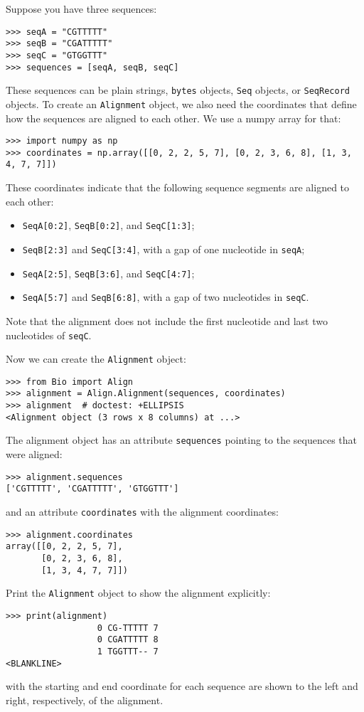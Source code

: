 Suppose you have three sequences:
\begin{verbatim}
>>> seqA = "CGTTTTT"
>>> seqB = "CGATTTTT"
>>> seqC = "GTGGTTT"
>>> sequences = [seqA, seqB, seqC]
\end{verbatim}
These sequences can be plain strings, \verb|bytes| objects, \verb|Seq| objects,  or \verb|SeqRecord| objects. To create an \verb|Alignment| object, we also need the coordinates that define how the sequences are aligned to each other. We use a numpy array for that:
\begin{verbatim}
>>> import numpy as np
>>> coordinates = np.array([[0, 2, 2, 5, 7], [0, 2, 3, 6, 8], [1, 3, 4, 7, 7]])
\end{verbatim}
These coordinates indicate that the following sequence segments are aligned to each other:
\begin{itemize}
\item \verb|SeqA[0:2]|, \verb|SeqB[0:2]|, and \verb|SeqC[1:3]|;
\item \verb|SeqB[2:3]| and \verb|SeqC[3:4]|, with a gap of one nucleotide in \verb|seqA|;
\item \verb|SeqA[2:5]|, \verb|SeqB[3:6]|, and \verb|SeqC[4:7]|;
\item \verb|SeqA[5:7]| and \verb|SeqB[6:8]|, with a gap of two nucleotides in \verb|seqC|.
\end{itemize}
Note that the alignment does not include the first nucleotide and last two nucleotides of \verb|seqC|.

Now we can create the \verb|Alignment| object:
\begin{verbatim}
>>> from Bio import Align
>>> alignment = Align.Alignment(sequences, coordinates)
>>> alignment  # doctest: +ELLIPSIS
<Alignment object (3 rows x 8 columns) at ...>
\end{verbatim}
The alignment object has an attribute \verb|sequences| pointing to the sequences that were aligned:
\begin{verbatim}
>>> alignment.sequences
['CGTTTTT', 'CGATTTTT', 'GTGGTTT']
\end{verbatim}
and an attribute \verb|coordinates| with the alignment coordinates:
\begin{verbatim}
>>> alignment.coordinates
array([[0, 2, 2, 5, 7],
       [0, 2, 3, 6, 8],
       [1, 3, 4, 7, 7]])
\end{verbatim}
Print the \verb+Alignment+ object to show the alignment explicitly:
\begin{verbatim}
>>> print(alignment)
                  0 CG-TTTTT 7
                  0 CGATTTTT 8
                  1 TGGTTT-- 7
<BLANKLINE>
\end{verbatim}
with the starting and end coordinate for each sequence are shown to the left and right, respectively, of the alignment.

